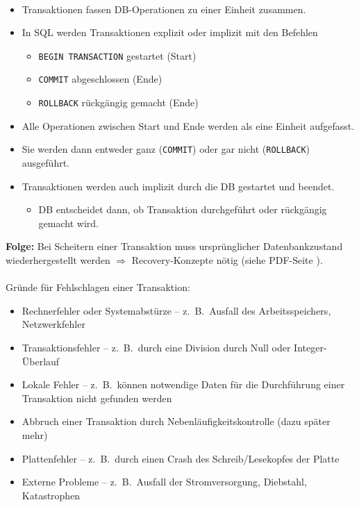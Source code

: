 \begin{frame}{\insertsection}
\framesubtitle{\insertsubsection}
\begin{itemize}
	\item Transaktionen fassen DB-Operationen zu einer Einheit zusammen.
	\item In SQL werden Transaktionen explizit oder implizit mit den Befehlen
	\begin{itemize}
		\item \texttt{BEGIN TRANSACTION} gestartet (Start)
		\item \texttt{COMMIT} abgeschlossen (Ende)
		\item \texttt{ROLLBACK} r\"uckg\"angig gemacht (Ende)
	\end{itemize}
	\pause
	\item Alle Operationen zwischen Start und Ende werden als eine Einheit aufgefasst. 
	\item Sie werden dann entweder ganz (\texttt{COMMIT}) oder gar nicht (\texttt{ROLLBACK}) ausgeführt.
	\pause
	\item Transaktionen werden auch implizit durch die DB gestartet und beendet.
	\begin{itemize}
		\item DB entscheidet dann, ob Transaktion durchgef\"uhrt oder r\"uckg\"angig gemacht wird.
	\end{itemize}
\end{itemize}
\abs\pause
\textbf{Folge:} Bei Scheitern einer Transaktion muss urspr\"unglicher Datenbankzustand wiederhergestellt werden
$\Rightarrow$ Recovery-Konzepte nötig (siehe PDF-Seite \pageref{sec:recovery}).
\end{frame}

\begin{frame}{\insertsection}
\framesubtitle{\insertsubsection}
\abs
\pause
Gründe für Fehlschlagen einer Transaktion:
\begin{itemize}
\item Rechnerfehler oder Systemabstürze -- z.~B.~Ausfall des Arbeitsspeichers, Netzwerkfehler\\[4pt]
\item Transaktionsfehler -- z.~B.~durch eine Division durch Null oder Integer-Überlauf\\[4pt]
\item Lokale Fehler -- z.~B.~können notwendige Daten für die Durchführung einer Transaktion nicht gefunden werden\\[4pt]
\item Abbruch einer Transaktion durch Nebenläufigkeitskontrolle (dazu später mehr)\\[4pt]
\item Plattenfehler -- z.~B.~durch einen Crash des Schreib/Lesekopfes der Platte \\[4pt]
\item Externe Probleme -- z.~B.~Ausfall der Stromversorgung, Diebstahl, Katastrophen \\[4pt]
\end{itemize}
\end{frame}

